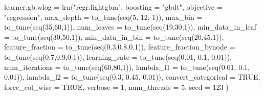 \documentclass[11pt,a4paper]{article}
\newenvironment{Shaded}{\begin{snugshade}}{\end{snugshade}}
\newcommand{\AttributeTok}[1]{\textcolor[rgb]{0.77,0.63,0.00}{#1}}
\newcommand{\ConstantTok}[1]{\textcolor[rgb]{0.00,0.00,0.00}{#1}}
\newcommand{\DecValTok}[1]{\textcolor[rgb]{0.00,0.00,0.81}{#1}}
\newcommand{\FloatTok}[1]{\textcolor[rgb]{0.00,0.00,0.81}{#1}}
\newcommand{\FunctionTok}[1]{\textcolor[rgb]{0.00,0.00,0.00}{#1}}
\newcommand{\NormalTok}[1]{#1}
\newcommand{\OtherTok}[1]{\textcolor[rgb]{0.56,0.35,0.01}{#1}}
\newcommand{\StringTok}[1]{\textcolor[rgb]{0.31,0.60,0.02}{#1}}
\begin{document}
\begin{Shaded}
\begin{Highlighting}[]
\NormalTok{learner.gb.wlog }\OtherTok{=} \FunctionTok{lrn}\NormalTok{(}\StringTok{"regr.lightgbm"}\NormalTok{,}
                 \AttributeTok{boosting =} \StringTok{"gbdt"}\NormalTok{,}
                 \AttributeTok{objective =} \StringTok{"regression"}\NormalTok{,}
                 \AttributeTok{max\_depth =} \FunctionTok{to\_tune}\NormalTok{(}\FunctionTok{seq}\NormalTok{(}\DecValTok{5}\NormalTok{, }\DecValTok{12}\NormalTok{, }\DecValTok{1}\NormalTok{)),}
                 \AttributeTok{max\_bin =} \FunctionTok{to\_tune}\NormalTok{(}\FunctionTok{seq}\NormalTok{(}\DecValTok{35}\NormalTok{,}\DecValTok{60}\NormalTok{,}\DecValTok{1}\NormalTok{)), }
                 \AttributeTok{num\_leaves =} \FunctionTok{to\_tune}\NormalTok{(}\FunctionTok{seq}\NormalTok{(}\DecValTok{19}\NormalTok{,}\DecValTok{30}\NormalTok{,}\DecValTok{1}\NormalTok{)),}
                 \AttributeTok{min\_data\_in\_leaf =} \FunctionTok{to\_tune}\NormalTok{(}\FunctionTok{seq}\NormalTok{(}\DecValTok{30}\NormalTok{,}\DecValTok{50}\NormalTok{,}\DecValTok{1}\NormalTok{)),}
                 \AttributeTok{min\_data\_in\_bin =} \FunctionTok{to\_tune}\NormalTok{(}\FunctionTok{seq}\NormalTok{(}\DecValTok{20}\NormalTok{,}\DecValTok{45}\NormalTok{,}\DecValTok{1}\NormalTok{)),}
                 \AttributeTok{feature\_fraction =} \FunctionTok{to\_tune}\NormalTok{(}\FunctionTok{seq}\NormalTok{(}\FloatTok{0.3}\NormalTok{,}\FloatTok{0.8}\NormalTok{,}\FloatTok{0.1}\NormalTok{)),}
                 \AttributeTok{feature\_fraction\_bynode =} \FunctionTok{to\_tune}\NormalTok{(}\FunctionTok{seq}\NormalTok{(}\FloatTok{0.7}\NormalTok{,}\FloatTok{0.9}\NormalTok{,}\FloatTok{0.1}\NormalTok{)),}
                 \AttributeTok{learning\_rate =} \FunctionTok{to\_tune}\NormalTok{(}\FunctionTok{seq}\NormalTok{(}\FloatTok{0.01}\NormalTok{, }\FloatTok{0.1}\NormalTok{, }\FloatTok{0.01}\NormalTok{)), }
                 \AttributeTok{num\_iterations  =} \FunctionTok{to\_tune}\NormalTok{(}\FunctionTok{seq}\NormalTok{(}\DecValTok{60}\NormalTok{,}\DecValTok{80}\NormalTok{,}\DecValTok{1}\NormalTok{)), }
                 \AttributeTok{lambda\_l1 =} \FunctionTok{to\_tune}\NormalTok{(}\FunctionTok{seq}\NormalTok{(}\FloatTok{0.01}\NormalTok{, }\FloatTok{0.1}\NormalTok{, }\FloatTok{0.01}\NormalTok{)),}
                 \AttributeTok{lambda\_l2 =} \FunctionTok{to\_tune}\NormalTok{(}\FunctionTok{seq}\NormalTok{(}\FloatTok{0.3}\NormalTok{, }\FloatTok{0.45}\NormalTok{, }\FloatTok{0.01}\NormalTok{)),}
                 \AttributeTok{convert\_categorical =} \ConstantTok{TRUE}\NormalTok{,}
                 \AttributeTok{force\_col\_wise =} \ConstantTok{TRUE}\NormalTok{,}
                 \AttributeTok{verbose =} \DecValTok{1}\NormalTok{,}
                 \AttributeTok{num\_threads =} \DecValTok{5}\NormalTok{,}
                 \AttributeTok{seed =} \DecValTok{123}
\NormalTok{)}
\end{Highlighting}
\end{Shaded}
\end{document}
